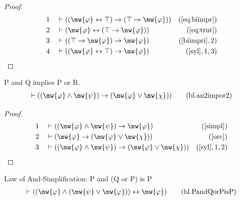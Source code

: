 \begin{proof}
\begin{align}
  1 &&  & \vdash ( ( \mw{\varphi} \leftrightarrow \top ) \rightarrow ( \top \rightarrow \mw{\varphi} ) )&(\mbox{\ref{eq:biimpr}})\notag
  \\ 2 &&  & \vdash ( \mw{\varphi} \leftrightarrow ( \top \rightarrow \mw{\varphi} ) )&(\mbox{\ref{eq:trut}})\notag
  \\ 3 &&  & \vdash ( ( \top \rightarrow \mw{\varphi} ) \rightarrow \mw{\varphi} )&(\mbox{\ref{biimpri}},2)\notag
  \\ 4 &&  & \vdash ( ( \mw{\varphi} \leftrightarrow \top ) \rightarrow \mw{\varphi} )&(\mbox{\ref{syl}},1,3)\notag
\end{align}
\end{proof}

\begin{lemma} P and Q implies P or R.
\begin{align}
\vdash ( ( \mw{\varphi} \wedge \mw{\psi} ) \rightarrow ( \mw{\varphi} \vee
    \mw{\chi} ) )\label{eq:bl.an2impor2}\tag{bl.an2impor2}
\end{align}
\end{lemma}

\begin{proof}
\begin{align}
  1 &&  & \vdash ( ( \mw{\varphi} \wedge \mw{\psi} ) \rightarrow \mw{\varphi} )&(\mbox{\ref{simpl}})\notag
  \\ 2 &&  & \vdash ( \mw{\varphi} \rightarrow ( \mw{\varphi} \vee \mw{\chi} ) )&(\mbox{\ref{orc}})\notag
  \\ 3 &&  & \vdash ( ( \mw{\varphi} \wedge \mw{\psi} ) \rightarrow ( \mw{\varphi} \vee \mw{\chi} ) )&(\mbox{\ref{syl}},1,2)\notag
\end{align}
\end{proof}

\begin{lemma} Law of And-Simplification: P and (Q
or P) is P
\begin{align}
\vdash ( ( \mw{\varphi} \wedge ( \mw{\psi} \vee \mw{\varphi} ) )
    \leftrightarrow \mw{\varphi} )\label{eq:bl.PandQorPisP}\tag{bl.PandQorPisP}
\end{align}
\end{lemma}

